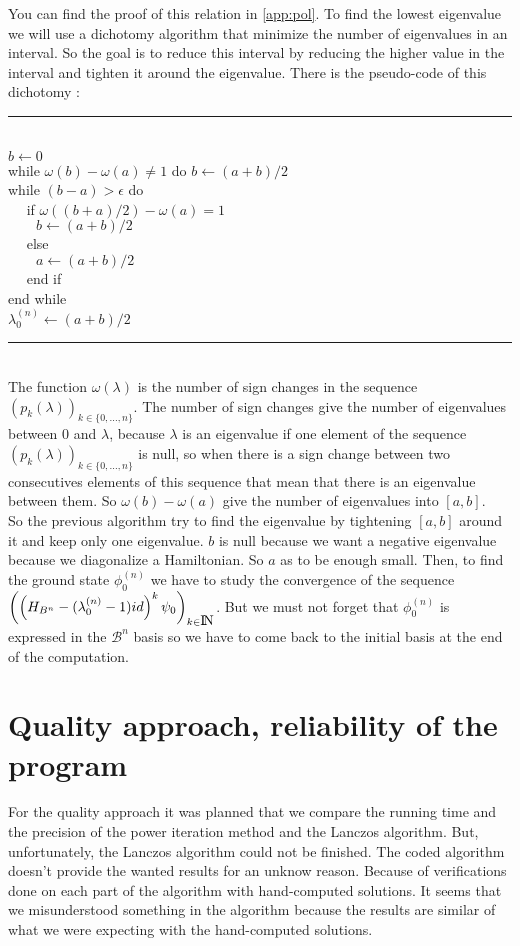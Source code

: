 \documentclass[1pt, a4paper]{article}
\begin{document}
You can find the proof of this relation in \autoref{app:pol}. To find the lowest eigenvalue we will use a dichotomy algorithm that minimize the number of eigenvalues in an interval. So the goal is to reduce this interval by reducing the higher value in the interval and tighten it around the eigenvalue. There is the pseudo-code of this dichotomy :\\
\hrule
\noindent
\\
$b\leftarrow 0$\\
while $\omega(b)-\omega(a)\ne 1$ do $b\leftarrow (a + b)/2$\\
while $(b-a) > \epsilon$ do\\
$\quad$ if $\omega ((b+a)/2) - \omega(a) = 1$\\
$\qquad b\leftarrow (a + b)/2$\\
$\quad$ else\\
$\qquad a\leftarrow (a + b)/2$\\
$\quad$ end if\\
end while\\
$\lambda^{(n)}_0 \leftarrow (a + b) / 2$\\
\hrule
\noindent
\\
The function $\omega(\lambda)$ is the number of sign changes in the sequence $(p_k(\lambda))_{k\in \{0,\dots,n\}}$. The number of sign changes give the number of eigenvalues between $0$ and $\lambda$, because $\lambda$ is an eigenvalue if one element of the sequence $(p_k(\lambda))_{k\in \{0,\dots,n\}}$ is null, so when there is a sign change between two consecutives elements of this sequence that mean that there is an eigenvalue between them. So $\omega(b)-\omega(a)$ give the number of eigenvalues into $[a, b]$.\\
So the previous algorithm try to find the eigenvalue by tightening $[a, b]$ around it and keep only one eigenvalue. $b$ is null because we want a negative eigenvalue because we diagonalize a Hamiltonian. So $a$ as to be enough small.
\newpage\noindent
Then, to find the ground state $\phi^{(n)}_0$ we have to study the convergence of the sequence $\left(\left(H_{B^n}-(\lambda_0^{(n)} - 1)id\right)^k\psi_0\right)_{k\in\mbox{I\hspace{-.15em}N}}$. But we must not forget that $\phi^{(n)}_0$ is expressed in the $\mathcal{B}^n$ basis so we have to come back to the initial basis at the end of the computation.
\section{Quality approach, reliability of the program}
\label{sec:qual}
\noindent
For the quality approach it was planned that we compare the running time and the precision of the power iteration method and the Lanczos algorithm. But, unfortunately, the Lanczos algorithm could not be finished. The coded algorithm doesn't provide the wanted results for an unknow reason. Because of verifications done on each part of the algorithm with hand-computed solutions. It seems that we misunderstood something in the algorithm because the results are similar of what we were expecting with the hand-computed solutions.
\end{document}
